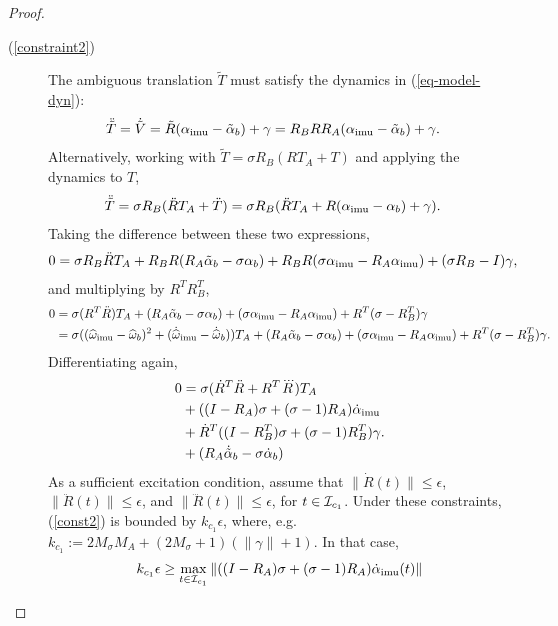 \begin{proof}
\begin{description}
\item[(\ref{constraint2})]
The ambiguous translation $\tilde T$ must satisfy the dynamics in (\ref{eq-model-dyn}):
\begin{align*}
\ddot{\tilde T} &= \dot{\tilde V}  = {\tilde R}(\alpha_\mathrm{imu} - \tilde\alpha_b) + \gamma
= R_B R R_A(\alpha_\mathrm{imu} - \tilde\alpha_b) + \gamma.
\end{align*}
Alternatively, working with $\tilde T = \sigma R_B(R T_A + T)$ and applying the dynamics to $T$,
\begin{align*}
\ddot{\tilde T} & = \sigma R_B(\ddot RT_A + \ddot T)
= \sigma R_B(\ddot RT_A + R (\alpha_\mathrm{imu} - \alpha_b) + \gamma).
\end{align*}
Taking the difference between these two expressions,
\begin{align*}
0 &= \sigma R_B\ddot R T_A
  + R_BR(R_A\tilde\alpha_b - \sigma\alpha_b)
  + R_BR(\sigma\alpha_\mathrm{imu} - R_A\alpha_\mathrm{imu})
  + (\sigma R_B - I)\gamma,
\end{align*}
and multiplying by $R^TR_B^T$,
\begin{align*}
0&= \sigma(R^T\ddot R)T_A
  + (R_A\tilde\alpha_b - \sigma\alpha_b)
  + (\sigma\alpha_\mathrm{imu} - R_A\alpha_\mathrm{imu})
  + R^T(\sigma - R_B^T)\gamma\\
&= \sigma(({\widehat{\omega}}_\mathrm{imu}-{\widehat{\omega}}_b)^2 + (\dot{{\widehat{\omega}}}_\mathrm{imu}-\dot{{\widehat{\omega}}}_b))T_A
  + (R_A\tilde\alpha_b - \sigma\alpha_b)
  + (\sigma\alpha_\mathrm{imu} - R_A\alpha_\mathrm{imu})
  + R^T(\sigma - R_B^T)\gamma.
\end{align*}
Differentiating again,
\begin{align}
0 &= \sigma(\dot R^T\ddot R + R^T\dddot R)T_A\label{const1}\\
  &+ ((I-R_A)\sigma + (\sigma-1)R_A)\dot\alpha_\mathrm{imu}\label{const2}\\
  &+ \dot R^T((I-R_B^T)\sigma + (\sigma-1)R_B^T)\gamma.\label{const3}\\
  &+ (R_A\dot{\tilde\alpha}_b - \sigma\dot{\alpha}_b)\label{const4}
\end{align}
As a sufficient excitation condition, assume that
$\|\dot R(t)\|\leq\epsilon$, $\|\ddot R(t)\|\leq\epsilon$, and
$\|\dddot R(t)\|\leq\epsilon$, for 
$t\in\mathcal{I}_{c_1}$.
Under these constraints, (\ref{const2}) is
bounded by $k_{c_1}\epsilon$, where, e.g. $k_{c_1} := 2M_\sigma M_A + (2M_\sigma+1)(\|\gamma\|+1)$.
In that case,
\begin{align*}
k_{c_1}\epsilon &\geq \max_{t\in\I_{c_1}}\|((I-R_A)\sigma + (\sigma-1)R_A)\dot\alpha\imu(t)\|\\                                                                                        

\end{align*}
\end{description}
\end{proof}

